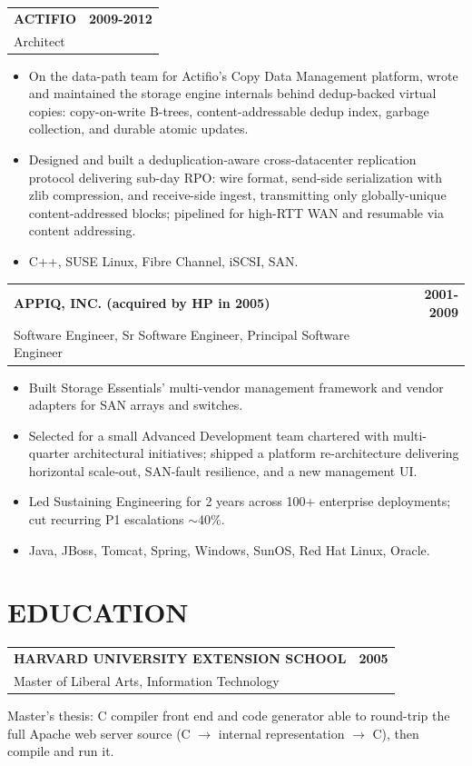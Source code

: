 \documentclass[11pt]{article}
\makeatletter
\newcommand{\resheader}[1]{\section*{#1}}
\newcommand{\jobheading}[4]{%
  \vspace{5.6pt}\begin{tabularx}{\textwidth}{@{}X r@{}}
    {\textbf{#1}} & {\textbf{#2}} \\
    {{\normalsize #3}\hspace{0.5em}{\color{muted}·}\hspace{0.5em}{\color{muted}#4}} & {} \\
  \end{tabularx}\vspace{2pt}
}
\makeatother
\begin{document}
\jobheading{ACTIFIO}{2009-2012}{Architect}{Waltham, MA}
\begin{itemize}
\item On the data-path team for Actifio's Copy Data Management platform, wrote and maintained the storage engine internals behind dedup-backed virtual copies: copy-on-write B-trees, content-addressable dedup index, garbage collection, and durable atomic updates.
\item Designed and built a deduplication-aware cross-datacenter replication protocol delivering sub-day RPO: wire format, send-side serialization with zlib compression, and receive-side ingest, transmitting only globally-unique content-addressed blocks; pipelined for high-RTT WAN and resumable via content addressing.
\item C++, SUSE Linux, Fibre Channel, iSCSI, SAN.
\end{itemize}

\jobheading{APPIQ, INC. (acquired by HP in 2005)}{2001-2009}{Software Engineer, Sr Software Engineer, Principal Software Engineer}{Marlborough, MA}
\begin{itemize}
\item Built Storage Essentials' multi-vendor management framework and vendor adapters for SAN arrays and switches.
\item Selected for a small Advanced Development team chartered with multi-quarter architectural initiatives; shipped a platform re-architecture delivering horizontal scale-out, SAN-fault resilience, and a new management UI.
\item Led Sustaining Engineering for 2 years across 100+ enterprise deployments; cut recurring P1 escalations $\sim$40\%.
\item Java, JBoss, Tomcat, Spring, Windows, SunOS, Red Hat Linux, Oracle.
\end{itemize}

\resheader{EDUCATION}

\jobheading{HARVARD UNIVERSITY EXTENSION SCHOOL}{2005}{Master of Liberal Arts, Information Technology}{Cambridge, MA}

Master's thesis: C compiler front end and code generator able to round-trip the full Apache web server source (C $\to$ internal representation $\to$ C), then compile and run it.
\end{document}
